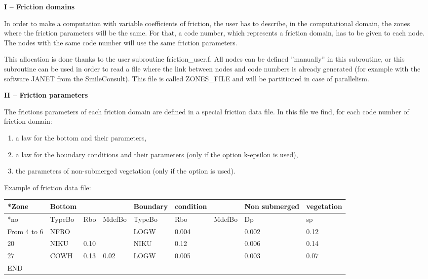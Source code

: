 \documentclass{article} %
\begin{document}
 \textbf{I -- Friction domains}

 In order to make a computation with variable coefficients of friction, the user has to describe, in the computational domain, the zones where the friction parameters will be the same. For that, a code number, which represents a friction domain, has to be given to each node. The nodes with the same code number will use the same friction parameters.

 This allocation is done thanks to the user subroutine friction\_user.f. All nodes can be defined ''manually'' in this subroutine, or this subroutine can be used in order to read a file where the link between nodes and code numbers is already generated (for example with the software JANET from the SmileConsult). This file is called ZONES\_FILE and will be partitioned in case of parallelism.

 \textbf{II -- Friction parameters}

 The frictions parameters of each friction domain are defined in a special friction data file. In this file we find, for each code number of friction domain:

\begin{enumerate}
\item  a law for the bottom and their parameters,

\item  a law for the boundary conditions and their parameters (only if the option k-epsilon is used),

\item  the parameters of non-submerged vegetation (only if the option is used).
\end{enumerate}

  Example of friction data file:



\begin{tabular}{|p{0.3in}|p{0.3in}|p{0.3in}|p{0.4in}|p{0.4in}|p{0.5in}|p{0.5in}|p{0.7in}|p{0.5in}|} \hline
*Zone & Bottom &  &  & Boundary & condition &  & Non submerged & vegetation \\ \hline
*no & TypeBo & Rbo & MdefBo & TypeBo & Rbo & MdefBo & Dp & sp \\ \hline
From 4 to 6 & NFRO &  &  & LOGW & 0.004 &  & 0.002 & 0.12 \\ \hline
20 & NIKU & 0.10 &  & NIKU & 0.12 &  & 0.006 & 0.14 \\ \hline
27 & COWH & 0.13 & 0.02 & LOGW & 0.005 &  & 0.003 & 0.07 \\ \hline
END &  &  &  &  &  &  &  &  \\ \hline
\end{tabular}
\end{document}
